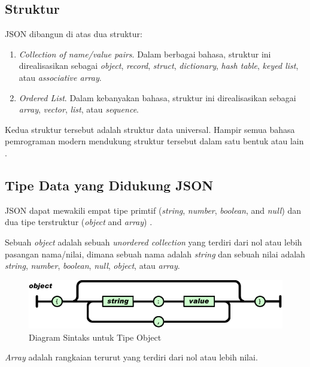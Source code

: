 \documentclass[a4paper, 12pt, oneside]{report}
\begin{document}
\subsection{Struktur}
\onehalfspacing JSON dibangun di atas dua struktur:
\begin{enumerate}
  \item \textit{Collection of name/value pairs}. Dalam berbagai bahasa, struktur ini direalisasikan sebagai \textit{object}, \textit{record}, \textit{struct}, \textit{dictionary}, \textit{hash table}, \textit{keyed list}, atau \textit{associative array}.
  \item \textit{Ordered List}. Dalam kebanyakan bahasa, struktur ini direalisasikan sebagai \textit{array}, \textit{vector}, \textit{list}, atau \textit{sequence}.
\end{enumerate}

\onehalfspacing Kedua struktur tersebut adalah struktur data universal. Hampir semua bahasa pemrograman modern mendukung struktur tersebut dalam satu bentuk atau lain \cite{introducing-json}.

\subsection{Tipe Data yang Didukung JSON}
\onehalfspacing JSON dapat mewakili empat tipe primtif (\textit{string}, \textit{number}, \textit{boolean}, and \textit{null}) dan dua tipe terstruktur (\textit{object} and \textit{array}) \cite{rfc-4627}.

\onehalfspacing Sebuah \textit{object} adalah sebuah \textit{unordered collection} yang terdiri dari nol atau lebih pasangan nama/nilai, dimana sebuah nama adalah \textit{string} dan sebuah nilai adalah \textit{string}, \textit{number}, \textit{boolean}, \textit{null}, \textit{object}, atau \textit{array}.

\begin{figure}[htp]
\centering
\includegraphics[scale=0.55]{images/object-json.png}
\caption{Diagram Sintaks untuk Tipe Object \cite{json-fat-free}}
\label{Diagram Sintaks untuk Tipe Object}
\end{figure}

\onehalfspacing \textit{Array} adalah rangkaian terurut yang terdiri dari nol atau lebih nilai.
\end{document}
